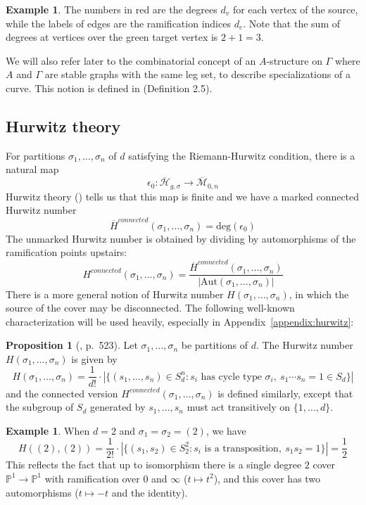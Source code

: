 \documentclass[11pt]{article}           %
\newcommand{\Aut}{\text{Aut}}
\newcommand{\Hb}{\overline{\mathcal H}}
\renewcommand{\P}{\mathbb P}
\theoremstyle{definition}
\newtheorem{prop}[thm]{Proposition}
\newtheorem{eg}[thm]{Example}
\begin{document}
\begin{eg}

                                      The numbers in red are the degrees $d_v$ for each vertex of the
                                      source, while the labels of edges
                                      are the ramification indices $d_e$.
                                      Note that the sum of degrees at
                                      vertices over the green target
                                      vertex is $2+1=3$.

\end{eg}

We will also refer later to the combinatorial concept
of an $A$-structure on $\Gamma$ where $A$ and $\Gamma$
are stable graphs with the same leg set, to describe
specializations of a curve. This notion is
defined in \cite{Schmitt} (Definition 2.5).

\subsection{Hurwitz theory}

For partitions $\sigma_1,\dots,\sigma_n$ of $d$
satisfying the Riemann-Hurwitz condition, there is a natural map
\[
\epsilon_0:\Hb_{g,\sigma}\to\overline{\mathcal M}_{0,n}
\]
Hurwitz theory (\cite{Cela}) tells us that this map is finite and we have a marked connected Hurwitz number
\[\overline H^{connected}(\sigma_1,\dots,\sigma_n)=\text{deg}(\epsilon_0)\]
The unmarked Hurwitz number is obtained by dividing by automorphisms of the ramification points upstairs:
\[
H^{connected}(\sigma_1,\dots,\sigma_n)=\frac{\overline H^{connected}(\sigma_1,\dots,\sigma_n)}{|\Aut(\sigma_1,\dots,\sigma_n)|}
\]
There is a more general notion of Hurwitz number $H(\sigma_1,\dots,\sigma_n)$, in which the source of
the cover may be disconnected.
The following well-known characterization will be used heavily,
especially in Appendix~\ref{appendix:hurwitz}:
\begin{prop}[\cite{Completed}, p.\ 523]
  Let $\sigma_1,\dots,\sigma_n$ be partitions of $d$. The Hurwitz number $H(\sigma_1,\dots,\sigma_n)$ is given by
  \[
  H(\sigma_1,\dots,\sigma_n)=\frac 1{d!}\cdot |\{(s_1,\dots,s_n)\in S_d^n:s_i\text{ has cycle type }\sigma_i,\ s_1\cdots s_n=1\in S_d\}|
  \]
  and the connected version $H^{connected}(\sigma_1,\dots,\sigma_n)$ is defined
  similarly, except that the subgroup of $S_d$ generated by $s_1,\dots,s_n$
  must act transitively on $\{1,\dots,d\}$.
\end{prop}
\begin{eg}
  When $d=2$ and $\sigma_1=\sigma_2=(2)$, we have
  \[
  H((2),(2))=\frac 1{2!}\cdot |\{(s_1,s_2)\in S_2^2:s_i\text{ is a transposition},\ s_1s_2=1\}|=\frac 12
  \]
  This reflects the fact that up to isomorphism there is a single degree $2$ cover $\P^1\to\P^1$ with ramification over $0$ and $\infty$ ($t\mapsto t^2$), and this cover has two automorphisms ($t\mapsto -t$ and the identity).
  \end{eg}
\end{document}
